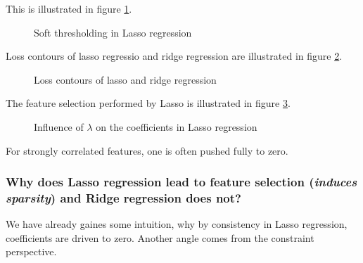

This is illustrated in figure \ref{fig:lasso_reg}.

\begin{figure}[!htb]
    \centering
    
    \caption{Soft thresholding in Lasso regression}
    \label{fig:lasso_reg}
\end{figure}

Loss contours of lasso regressio and ridge regression are illustrated in figure \ref{fig:ridge_lasso_contours}.

\begin{figure}[!htb]
    \centering
    
    \caption{Loss contours of lasso and ridge regression}
    \label{fig:ridge_lasso_contours}
\end{figure}

The feature selection performed by Lasso is illustrated in figure \ref{fig:lasso_lambda}.

\begin{figure}[!htb]
    \centering
    
    \caption{Influence of $\lambda$ on the coefficients in Lasso regression}
    \label{fig:lasso_lambda}
\end{figure}

For strongly correlated features, one is often pushed fully to zero.

\subsubsection{Why does Lasso regression lead to feature selection (\textit{induces sparsity}) and Ridge regression does not?}
We have already gaines some intuition, why by consistency in Lasso regression, coefficients are driven to zero.
Another angle comes from the constraint perspective.

